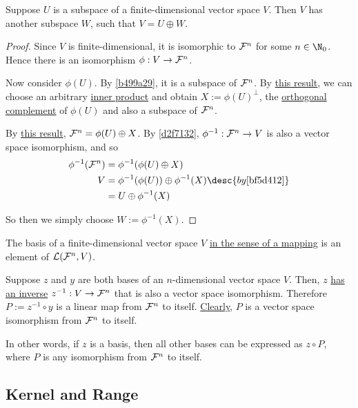 \label{ad97a8e}

Suppose $U$ is a subspace of a finite-dimensional vector space $V$. Then $V$
has another subspace $W$, such that $V=U\oplus W$.

\begin{proof}
  Since $V$ is finite-dimensional, it is isomorphic to $\mathcal F^n$ for some
  $n\in\N_0$. Hence there is an isomorphism $\phi:V\to\mathcal F^n$.

  Now consider $\phi(U)$. By \autoref{b499a29}, it is a subspace of $\mathcal F^n$. By
  \href{d7186eb}{this result}, we can choose an arbitrary \href{cebd07a}{inner
  product} and obtain $X:=\phi(U)^\perp$, the \href{c3c519f}{orthogonal
  complement} of $\phi(U)$ and also a subspace of $\mathcal F^n$.

  By \href{e77e5ea}{this result}, $\mathcal F^n=\phi(U)\oplus X$. By \autoref{d2f7132},
  $\phi^{-1}:\mathcal F^n\to V$ is also a vector space isomorphism, and so
  \begin{align*}
    \phi^{-1}(\F^n) &=\phi^{-1}(\phi(U)\oplus X)                                      \\
    V               &=\phi^{-1}(\phi(U))\oplus\phi^{-1}(X)\desc{by \autoref{bf5d412}} \\
                    &=U\oplus\phi^{-1}(X)
  \end{align*}

  So then we simply choose $W:=\phi^{-1}(X)$.
\end{proof}

\Remark{}\label{d94b18e}

The basis of a finite-dimensional vector space $V$ \href{f62907b}{in the sense
of a mapping} is an element of $\mathcal L(\mathcal F^n,V)$.

\label{ede31d2}

Suppose $z$ and $y$ are both bases of an $n$-dimensional vector space $V$.
Then, $z$ \href{d2f7132}{has an inverse} $z^{-1}:V\to\mathcal F^n$ that is also a
vector space isomorphism. Therefore $P:=z^{-1}\circ y$ is a linear map from
$\mathcal F^n$ to itself. \href{b80882d}{Clearly}, $P$ is a vector space isomorphism
from $\mathcal F^n$ to itself.

In other words, if $z$ is a basis, then all other bases can be expressed as
$z\circ P$, where $P$ is any isomorphism from $\mathcal F^n$ to itself.

\subsection{Kernel and Range}\label{fb87927}

